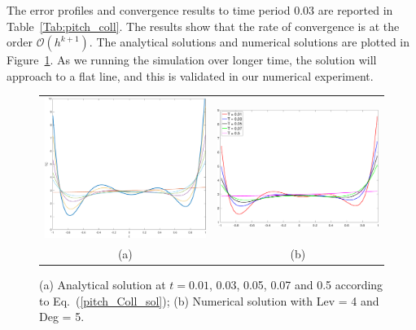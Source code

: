 \documentclass[preprint,11pt]{elsarticle}
\begin{document}
The error profiles and convergence results to time period $0.03$ are reported in Table~\ref{Tab:pitch_coll}. The results show that the rate of convergence is at the order $\mathcal{O}(h^{k+1})$.
The analytical solutions and numerical solutions are plotted in Figure~\ref{Fig:pitch_coll}. As we running the simulation over longer time, the solution will approach to a flat line, and this is validated in our numerical experiment.




\begin{figure}[H]
\centering
\begin{tabular}{cc}
 \includegraphics[width=.45\textwidth]{FIGURES/fig_Coll_time-eps-converted-to}
  &\includegraphics[width=.45\textwidth,height=.4\textwidth]{./NumFig/Diff-Deg5_Lev4}\\
  \footnotesize (a) & \footnotesize(b) 
\end{tabular}
\caption{(a) Analytical solution at 
$t=0.01$, 0.03, 0.05, 0.07 and 0.5 according to Eq.~(\ref{pitch_Coll_sol}); (b) Numerical solution with Lev = 4 and Deg = 5.}\label{Fig:pitch_coll}

\end{figure}

\end{document}
